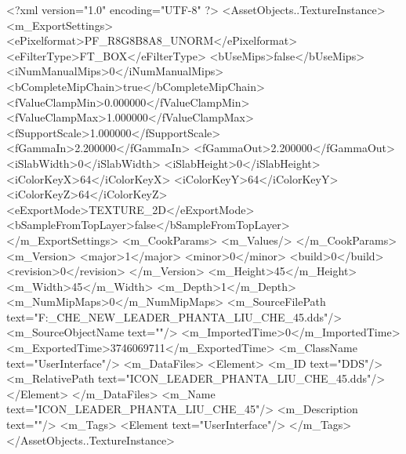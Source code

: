<?xml version="1.0" encoding="UTF-8" ?>
<AssetObjects..TextureInstance>
	<m_ExportSettings>
		<ePixelformat>PF_R8G8B8A8_UNORM</ePixelformat>
		<eFilterType>FT_BOX</eFilterType>
		<bUseMips>false</bUseMips>
		<iNumManualMips>0</iNumManualMips>
		<bCompleteMipChain>true</bCompleteMipChain>
		<fValueClampMin>0.000000</fValueClampMin>
		<fValueClampMax>1.000000</fValueClampMax>
		<fSupportScale>1.000000</fSupportScale>
		<fGammaIn>2.200000</fGammaIn>
		<fGammaOut>2.200000</fGammaOut>
		<iSlabWidth>0</iSlabWidth>
		<iSlabHeight>0</iSlabHeight>
		<iColorKeyX>64</iColorKeyX>
		<iColorKeyY>64</iColorKeyY>
		<iColorKeyZ>64</iColorKeyZ>
		<eExportMode>TEXTURE_2D</eExportMode>
		<bSampleFromTopLayer>false</bSampleFromTopLayer>
	</m_ExportSettings>
	<m_CookParams>
		<m_Values/>
	</m_CookParams>
	<m_Version>
		<major>1</major>
		<minor>0</minor>
		<build>0</build>
		<revision>0</revision>
	</m_Version>
	<m_Height>45</m_Height>
	<m_Width>45</m_Width>
	<m_Depth>1</m_Depth>
	<m_NumMipMaps>0</m_NumMipMaps>
	<m_SourceFilePath text="F:\MOD\TEMPLATE\LIU_CHE_NEW\ICON_LEADER_PHANTA_LIU_CHE_45.dds"/>
	<m_SourceObjectName text=""/>
	<m_ImportedTime>0</m_ImportedTime>
	<m_ExportedTime>3746069711</m_ExportedTime>
	<m_ClassName text="UserInterface"/>
	<m_DataFiles>
		<Element>
			<m_ID text="DDS"/>
			<m_RelativePath text="ICON_LEADER_PHANTA_LIU_CHE_45.dds"/>
		</Element>
	</m_DataFiles>
	<m_Name text="ICON_LEADER_PHANTA_LIU_CHE_45"/>
	<m_Description text=""/>
	<m_Tags>
		<Element text="UserInterface"/>
	</m_Tags>
</AssetObjects..TextureInstance>

